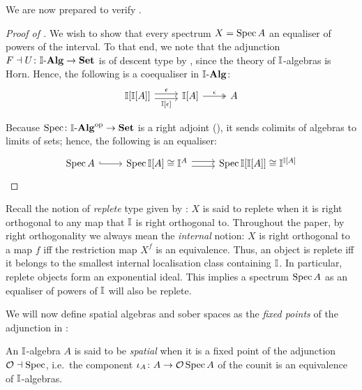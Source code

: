 We are now prepared to verify .

\begin{proof}[Proof of ]
  We wish to show that every spectrum $X=\operatorname{Spec} A$ an equaliser of powers of the interval.
  To that end, we note that the adjunction $F\dashv U\colon \I\alg \to\Set$ is of descent type by , since the theory of $\mathbb{I}$-algebras is Horn. Hence, the following is a coequaliser in $\I\alg$: 
  \[
  \begin{tikzcd}
    \I[\I[A]] \ar[r, shift left, "\epsilon"] \ar[r, shift right, "{\I[\epsilon]}"'] & \I[A] \ar[r, two heads, "\epsilon"] & A
  \end{tikzcd}
  \]

  Because $\spec\colon \I\alg\op\to\Set$ is a right adjoint (), it sends colimits of algebras to limits of sets; hence, the following is an equaliser:
  \[
  \begin{tikzcd}
    \spec A \ar[r, hook] & \spec\I[A] \cong \I^A \ar[r, shift left] \ar[r, shift right] & \spec\I[\I[A]]\cong\I^{\I[A]}
  \end{tikzcd}
  \qedhere
  \]
\end{proof}

\begin{remark}\label{rem:specarereplete}
  Recall the notion of \emph{replete} type given by \citet{hyland1990first}: $X$ is said to replete when it is right orthogonal to any map that $\mathbb{I}$ is right orthogonal to. Throughout the paper, by right orthogonality we always mean the \emph{internal} notion: $X$ is right orthogonal to a map $f$ iff the restriction map $X^f$ is an equivalence. Thus, an object is replete iff it belongs to the smallest internal localisation class containing $\mathbb{I}$. In particular, replete objects form an exponential ideal. This implies a spectrum $\operatorname{Spec} A$ as an equaliser of powers of $\mathbb{I}$ will also be replete.
\end{remark}

We will now define spatial algebras and sober spaces as the \emph{fixed points} of the adjunction in :

\begin{definition}
  An $\mathbb{I}$-algebra $A$ is said to be \emph{spatial} when it is a fixed point of the adjunction $\mathcal{O} \dashv \operatorname{Spec}$, i.e.\ the component $\iota_A\colon A \to \mathcal{O} \operatorname{Spec} A$ of the counit is an equivalence of $\mathbb{I}$-algebras.
\end{definition}

